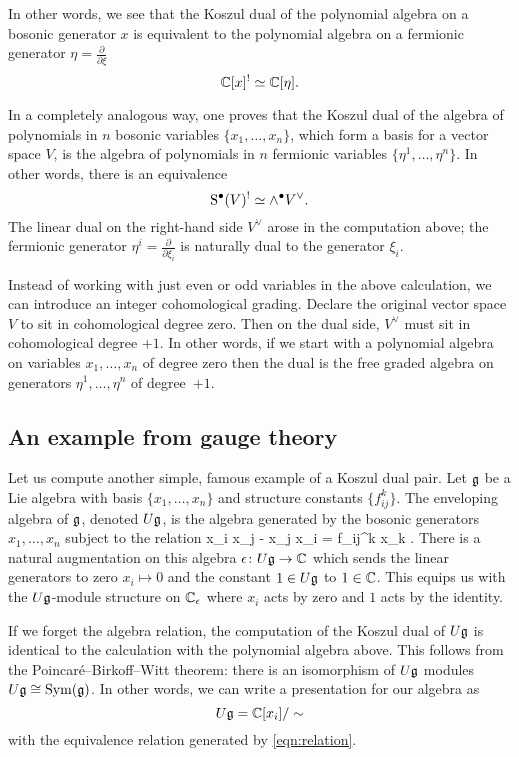 \documentclass[11pt]{amsart}
\begin{document}
In other words, we see that the Koszul dual of the polynomial algebra on a bosonic generator $x$ is equivalent to the polynomial algebra on a fermionic generator $\eta = \frac{\partial}{\partial \xi}$
\[
\mathbb C[x]^! \simeq \mathbb C[\eta] .
\]

In a completely analogous way, one proves that the Koszul dual of the algebra of polynomials in $n$ bosonic variables $\{x_1,\ldots, x_n\}$, which form a basis for a vector space $V$, is the algebra of polynomials in $n$ fermionic variables $\{\eta^1,\ldots,\eta^n\}$. 
In other words, there is an equivalence
\[
{\rm S}^\bullet (V)^! \simeq \wedge^\bullet V^\vee .
\]
The linear dual on the right-hand side $V^{\vee}$ arose in the computation above; the fermionic generator $\eta^i = \frac{\partial}{\partial \xi_i}$ is naturally dual to the generator $\xi_i$. 

Instead of working with just even or odd variables in the above calculation, we can introduce an integer cohomological grading. 
Declare the original vector space $V$ to sit in cohomological degree zero. 
Then on the dual side, $V^\vee$ must sit in cohomological degree $+1$.
In other words, if we start with a polynomial algebra on variables $x_1,\ldots,x_n$ of degree zero then the dual is the free graded algebra on generators $\eta^1,\ldots,\eta^n$ of degree~$+1$.

\subsection{An example from gauge theory}


Let us compute another simple, famous example of a Koszul dual pair.
Let $\mathfrak g$ be a Lie algebra with basis $\{x_1,\ldots, x_n\}$ and structure constants $\{f_{ij}^k\}$. 
The enveloping algebra of $\mathfrak g$, denoted $U \mathfrak g$, is the algebra generated by the bosonic generators $x_1,\ldots,x_n$ subject to the relation 
\beqn \label{eqn:relation}
x_i x_j - x_j x_i = f_{ij}^k x_k .
\eeqn
There is a natural augmentation on this algebra $\epsilon \colon U \mathfrak g \to \mathbb C$ which sends the linear generators to zero $x_i \mapsto 0$ and the constant $1 \in U \mathfrak g$ to $1 \in \mathbb C$. 
This equips us with the $U \mathfrak g$-module structure on $\mathbb C_\epsilon$ where $x_i$ acts by zero and $1$ acts by the identity. 

If we forget the algebra relation, the computation of the Koszul dual of $U \mathfrak g$ is identical to the calculation with the polynomial algebra above. 
This follows from the Poincar\'e--Birkoff--Witt theorem: there is an isomorphism of $U\mathfrak g$ modules $U \mathfrak g \cong \operatorname{Sym} (\mathfrak g)$. 
In other words, we can write a presentation for our algebra as
\[
U \mathfrak g = \mathbb C[x_i] / \sim 
\]
with the equivalence relation generated by \eqref{eqn:relation}. 
\end{document}
